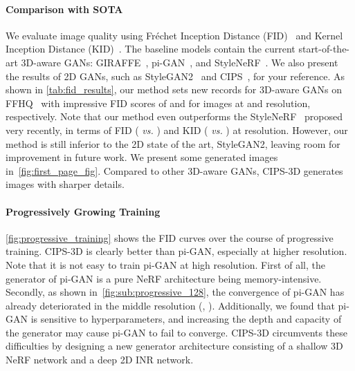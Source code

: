 \documentclass[10pt,twocolumn,letterpaper]{article}
\begin{document}
\paragraph{Comparison with SOTA}
We evaluate image quality using Fréchet Inception Distance (FID)~\cite{heusel2017GANs} and Kernel Inception Distance (KID)~\cite{binkowski2021Demystifying}. The baseline models contain the current start-of-the-art 3D-aware GANs: GIRAFFE~\cite{niemeyer2021GIRAFFE}, pi-GAN~\cite{chan2021piGAN}, and StyleNeRF~\cite{anonymous2021StyleNeRF}. We also present the results of 2D GANs, such as StyleGAN2~\cite{karras2019Analyzing} and CIPS~\cite{anokhin2021Image}, for your reference. As shown in \cref{tab:fid_results}, our method sets new records for 3D-aware GANs on FFHQ~\cite{karras2019StyleBased} with impressive FID scores of  and  for images at  and  resolution, respectively. Note that our method even outperforms the StyleNeRF~\cite{anonymous2021StyleNeRF} proposed very recently, in terms of FID ( \textit{vs.} ) and KID ( \textit{vs.} ) at  resolution. However, our method is still inferior to the 2D state of the art, StyleGAN2, leaving room for improvement in future work.
We present some generated images in~\cref{fig:first_page_fig}. Compared to other 3D-aware GANs, CIPS-3D generates images with sharper details.


\paragraph{Progressively Growing Training}
\cref{fig:progressive_training} shows the FID curves over the course of progressive training. CIPS-3D is clearly better than pi-GAN, especially at higher resolution. Note that it is not easy to train pi-GAN at high resolution. First of all, the generator of pi-GAN is a pure NeRF architecture being memory-intensive. Secondly, as shown in~\cref{fig:sub:progressive_128}, the convergence of pi-GAN has already deteriorated in the middle resolution (\ie, ). Additionally, we found that pi-GAN is sensitive to hyperparameters, and increasing the depth and capacity of the generator may cause pi-GAN to fail to converge. CIPS-3D circumvents these difficulties by designing a new generator architecture consisting of a shallow 3D NeRF network and a deep 2D INR network.
\end{document}
